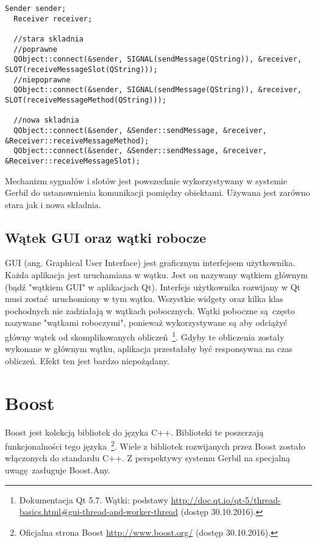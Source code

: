 \begin{minipage}{\textwidth}

	\begin{lstlisting}[label=connectionsyntax, caption={Składnia tworzenia połączeń między obiektami},alsoletter={()[].=}]
  Sender sender;
  Receiver receiver;
  
  //stara skladnia
  //poprawne
  QObject::connect(&sender, SIGNAL(sendMessage(QString)), &receiver, SLOT(receiveMessageSlot(QString)));
  //niepoprawne
  QObject::connect(&sender, SIGNAL(sendMessage(QString)), &receiver, SLOT(receiveMessageMethod(QString)));
  
  //nowa skladnia
  QObject::connect(&sender, &Sender::sendMessage, &receiver, &Receiver::receiveMessageMethod);
  QObject::connect(&sender, &Sender::sendMessage, &receiver, &Receiver::receiveMessageSlot);
	\end{lstlisting}
\end{minipage}

Mechanizm sygnałów i slotów jest powszechnie wykorzystywany w systemie Gerbil do ustanownienia komunikacji pomiędzy obiektami. Używana jest zarówno stara jak i nowa składnia.

\subsection{Wątek GUI oraz wątki robocze}
GUI (ang. Graphical User Interface) jest graficznym interfejsem użytkownika. Każda aplikacja jest uruchamiana w wątku. Jest on nazywany wątkiem głównym (bądź "wątkiem GUI" w aplikacjach Qt). Interfejs użytkownika rozwijany w Qt musi zostać uruchomiony w tym wątku. Wszystkie widgety oraz kilka klas pochodnych nie zadziałają w wątkach pobocznych. Wątki poboczne są często nazywane "wątkami roboczymi", ponieważ wykorzystywane są aby odciążyć główny wątek od skomplikowanych obliczeń~\footnote{Dokumentacja Qt 5.7. Wątki: podstawy \url{http://doc.qt.io/qt-5/thread-basics.html\#gui-thread-and-worker-thread} (dostęp 30.10.2016).}. Gdyby te obliczenia zostały wykonane w głównym wątku, aplikacja przestałaby być responsywna na czas obliczeń. Efekt ten jest bardzo niepożądany.

 \section{Boost}
Boost jest kolekcją bibliotek do języka C++. Biblioteki te poszerzają funkcjonalności tego języka~\footnote{Oficjalna strona Boost \url{http://www.boost.org/} (dostęp 30.10.2016).}. Wiele z bibliotek rozwijanych przez Boost zostało włączonych do standardu C++. Z perspektywy systemu Gerbil na specjalną uwagę zasługuje Boost.Any.



